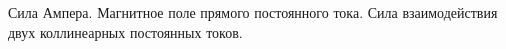 \documentclass[__main__.tex]{subfiles}
\begin{document}
Сила Ампера. Магнитное поле прямого постоянного тока. Сила взаимодействия двух коллинеарных постоянных токов.\\ 

\end{document}
